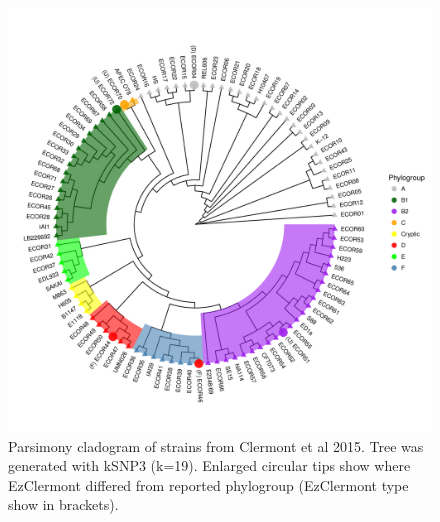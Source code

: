 \begin{figure}[h]
  \centering
  \includegraphics[width=.5\textwidth]{./analysis/cladogram.pdf}
  \caption{ Parsimony cladogram of strains from Clermont et al 2015. Tree was generated with kSNP3 (k=19). Enlarged circular tips show where EzClermont differed from reported phylogroup (EzClermont type show in brackets).}
  \label{fig:cladogram}
\end{figure}